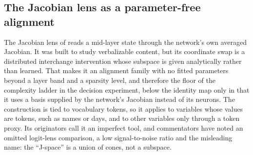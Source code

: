 
\subsection{The Jacobian lens as a parameter-free alignment}
\label{app:topo-jlens}

\LAssess{} The Jacobian lens of \cite{gurnee2026workspace} reads a
mid-layer state through the network's own averaged Jacobian. It was built to
study verbalizable content, but its coordinate swap is a distributed
interchange intervention whose subspace is given analytically rather than
learned. That makes it an alignment family with no fitted parameters beyond
a layer band and a sparsity level, and therefore the floor of the complexity
ladder in the decision experiment, below the identity map only in that it
uses a basis supplied by the network's Jacobian instead of its neurons. The
construction is tied to vocabulary tokens, so it applies to variables whose
values are tokens, such as names or days, and to other variables only
through a token proxy. Its originators call it an imperfect tool, and
commentators have noted an omitted logit-lens comparison, a low
signal-to-noise ratio and the misleading name: the ``J-space'' is a union
of cones, not a subspace.

